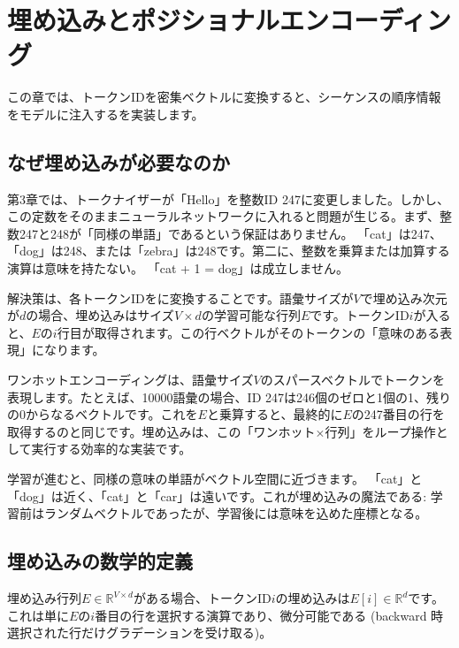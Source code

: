 \chapter{埋め込みとポジショナルエンコーディング}
\label{ch:embedding}

この章では、トークンIDを密集ベクトルに変換すると、シーケンスの順序情報をモデルに注入するを実装します。

\section{なぜ埋め込みが必要なのか}

第3章では、トークナイザーが「Hello」を整数ID 247に変更しました。しかし、この定数をそのままニューラルネットワークに入れると問題が生じる。まず、整数247と248が「同様の単語」であるという保証はありません。 「cat」は247、「dog」は248、または「zebra」は248です。第二に、整数を乗算または加算する演算は意味を持たない。 「cat + 1 = dog」は成立しません。

解決策は、各トークンIDをに変換することです。語彙サイズが$V$で埋め込み次元が$d$の場合、埋め込みはサイズ$V \times d$の学習可能な行列$E$です。トークンID$i$が入ると、$E$の$i$行目が取得されます。この行ベクトルがそのトークンの「意味のある表現」になります。

\begin{infobox}[なぜ「密集」なのか？]
ワンホットエンコーディングは、語彙サイズ$V$のスパースベクトルでトークンを表現します。たとえば、10000語彙の場合、ID 247は246個のゼロと1個の1、残りの0からなるベクトルです。これを$E$と乗算すると、最終的に$E$の247番目の行を取得するのと同じです。埋め込みは、この「ワンホット$\times$行列」をループ操作として実行する効率的な実装です。

学習が進むと、同様の意味の単語がベクトル空間に近づきます。 「cat」と「dog」は近く、「cat」と「car」は遠いです。これが埋め込みの魔法である: 学習前はランダムベクトルであったが、学習後には意味を込めた座標となる。
\end{infobox}

\section{埋め込みの数学的定義}

埋め込み行列$E \in \mathbb{R}^{V \times d}$がある場合、トークンID$i$の埋め込みは$E[i] \in \mathbb{R}^d$です。これは単に$E$の$i$番目の行を選択する演算であり、微分可能である (backward 時選択された行だけグラデーションを受け取る)。

